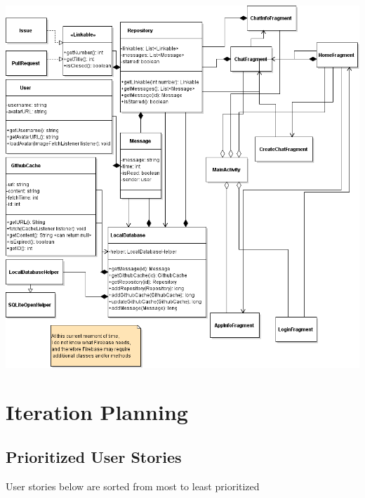 \documentclass{report}
\begin{document}
\begin{center}
    \includegraphics[scale=0.5]{uml-diagram}
\end{center}


\chapter{Iteration Planning}

\section{Prioritized User Stories}

User stories below are sorted from most to least prioritized
\end{document}
